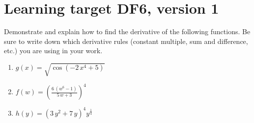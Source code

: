 \section{Learning target DF6, version 1}
\providecommand{\stxKnowl}{}\renewcommand{\stxKnowl}[1]{#1}
\providecommand{\stxOuttro}{}\renewcommand{\stxOuttro}[1]{#1}
\providecommand{\stxTitle}{}\renewcommand{\stxTitle}[1]{#1}
\renewcommand{\stxOuttro}[1]{}
\stxKnowl{
 Demonstrate and explain how to find the derivative of the following functions. Be sure to write down which derivative rules (constant multiple, sum and difference, etc.) you are using in your work. 

\begin{enumerate}
\item
\stxKnowl{
\(g(x) = \sqrt{\cos\left(-2 \, x^{4} + 5\right)}\)

\stxOuttro{
\[g ' (x) = \frac{4 \, x^{3} \sin\left(-2 \, x^{4} + 5\right)}{\sqrt{\cos\left(-2 \, x^{4} + 5\right)}}\]

}
}
\vfill
\item
\stxKnowl{
\(f(w) = \left( \frac{6 \, {\left(w^{6} - 1\right)}}{5 \, w + 3} \right)^{ 4 }\)

\stxOuttro{
\[f ' (w) = 4 \left( \frac{6 \, {\left(w^{6} - 1\right)}}{5 \, w + 3} \right)^{ 3 } \left( \frac{36 \, w^{5}}{5 \, w + 3} - \frac{30 \, {\left(w^{6} - 1\right)}}{{\left(5 \, w + 3\right)}^{2}} \right)\]

}
}
\vfill
\item
\stxKnowl{
\(h(y) = {\left(3 \, y^{2} + 7 \, y\right)}^{4} y^{\frac{1}{4}}\)

\stxOuttro{
\[h ' (y) = 4 \, {\left(3 \, y^{2} + 7 \, y\right)}^{3} {\left(6 \, y + 7\right)} y^{\frac{1}{4}} + \frac{{\left(3 \, y^{2} + 7 \, y\right)}^{4}}{4 \, y^{\frac{3}{4}}}\]

}
}
\vfill
\end{enumerate}
}

\pagebreak

